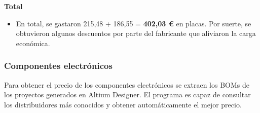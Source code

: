 \hspace{1cm}

\textbf{Total}
\begin{itemize}
	\item En total, se gastaron 215,48 + 186,55 = \textbf{402,03 \euro{}} en placas. Por suerte, se obtuvieron algunos descuentos por parte del fabricante que aliviaron la carga económica.
\end{itemize}

\subsubsection*{Componentes electrónicos}
Para obtener el precio de los componentes electrónicos se extraen los BOMs de los proyectos generados en Altium Designer. El programa es capaz de consultar los distribuidores más conocidos y obtener automáticamente el mejor precio.

